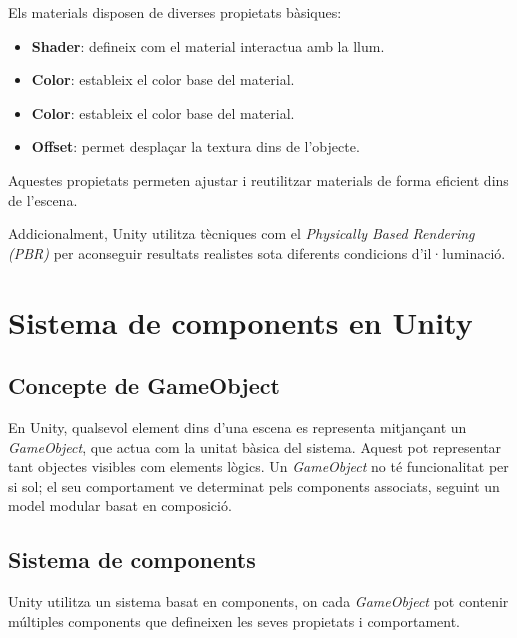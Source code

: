 \documentclass[12pt,a4paper]{report}
\begin{document}
Els materials disposen de diverses propietats bàsiques:

\begin{itemize}

\item \textbf{Shader}: defineix com el material interactua amb la llum. \cite{UnityShaders}


\item \textbf{Color}: estableix el color base del material.


\item \textbf{Color}: estableix el color base del material.


\item \textbf{Offset}: permet desplaçar la textura dins de l'objecte. \cite{UnityTextureProperties}


\end{itemize}

Aquestes propietats permeten ajustar i reutilitzar materials de forma eficient dins de l'escena.

Addicionalment, Unity utilitza tècniques com el \textit{Physically Based Rendering (PBR)} per aconseguir resultats realistes sota diferents condicions d'il·luminació. \cite{UnityMaterialsIntro}

\section{Sistema de components en Unity}

\subsection{Concepte de GameObject}

En Unity, qualsevol element dins d'una escena es representa mitjançant un \textit{GameObject}, que actua com la unitat bàsica del sistema. Aquest pot representar tant objectes visibles com elements lògics. Un \textit{GameObject} no té funcionalitat per si sol; el seu comportament ve determinat pels components associats, seguint un model modular basat en composició. \cite{UnityGameObjects}


\subsection{Sistema de components}

Unity utilitza un sistema basat en components, on cada \textit{GameObject} pot contenir múltiples components que defineixen les seves propietats i comportament.
\end{document}
